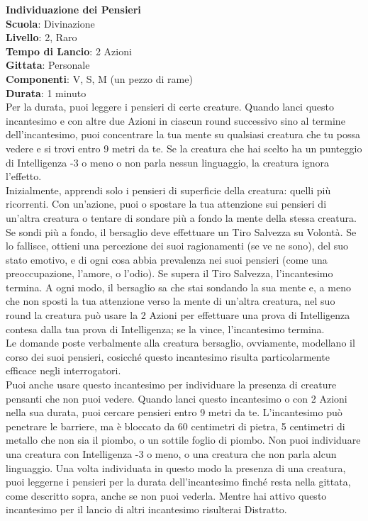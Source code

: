 \begin{multicols}{2}
\medskip\textbf{Individuazione dei Pensieri}\\
\textbf{Scuola}: Divinazione\\
\textbf{Livello}: 2, Raro\\
\textbf{Tempo di Lancio}: 2 Azioni\\
\textbf{Gittata}: Personale\\
\textbf{Componenti}: V, S, M (un pezzo di rame)\\
\textbf{Durata}: 1 minuto\\
Per la durata, puoi leggere i pensieri di certe creature. Quando lanci questo incantesimo e con altre due Azioni in ciascun round successivo sino al termine dell'incantesimo, puoi concentrare la tua mente su qualsiasi creatura che tu possa vedere e si trovi entro 9 metri da te. Se la creatura che hai scelto ha un punteggio di Intelligenza -3 o meno o non parla nessun linguaggio, la creatura ignora l'effetto.\\
Inizialmente, apprendi solo i pensieri di superficie della creatura: quelli più ricorrenti. Con un'azione, puoi o spostare la tua attenzione sui pensieri di un'altra creatura o tentare di sondare più a fondo la mente della stessa creatura. Se sondi più a fondo, il bersaglio deve effettuare un Tiro Salvezza su Volontà. Se lo fallisce, ottieni una percezione dei suoi ragionamenti (se ve ne sono), del suo stato emotivo, e di ogni cosa abbia prevalenza nei suoi pensieri (come una preoccupazione, l'amore, o l'odio). Se supera il Tiro Salvezza, l'incantesimo termina. A ogni modo, il bersaglio sa che stai sondando la sua mente e, a meno che non sposti la tua attenzione verso la mente di un'altra creatura, nel suo round la creatura può usare la 2 Azioni per effettuare una prova di Intelligenza contesa dalla tua prova di Intelligenza; se la vince, l'incantesimo termina.\\
Le domande poste verbalmente alla creatura bersaglio, ovviamente, modellano il corso dei suoi pensieri, cosicché questo incantesimo risulta particolarmente efficace negli interrogatori.\\
Puoi anche usare questo incantesimo per individuare la presenza di creature pensanti che non puoi vedere. Quando lanci questo incantesimo o con 2 Azioni nella sua durata, puoi cercare pensieri entro 9 metri da te. L'incantesimo può penetrare le barriere, ma è bloccato da 60 centimetri di pietra, 5 centimetri di metallo che non sia il piombo, o un sottile foglio di piombo. Non puoi individuare una creatura con Intelligenza -3 o meno, o una creatura che non parla alcun linguaggio. Una volta individuata in questo modo la presenza di una creatura, puoi leggerne i pensieri per la durata dell'incantesimo finché resta nella gittata, come descritto sopra, anche se non puoi vederla.
Mentre hai attivo questo incantesimo per il lancio di altri incantesimo risulterai Distratto.


\end{multicols}
